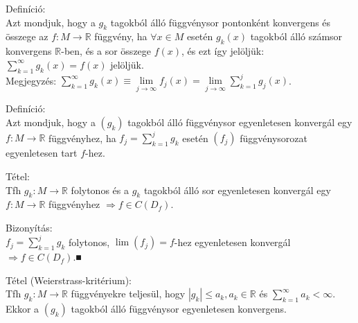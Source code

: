 \documentclass[12pt,a4paper]{scrartcl}
\newenvironment{definicio}{}{}
\newenvironment{tetel}{}{}
\newenvironment{bizonyitas}{}{}
\begin{document}
\begin{definicio}

Definíció:\\
Azt mondjuk, hogy a \(g_{k}\) tagokból álló függvénysor pontonként
konvergens és összege az \(\left. f:M\rightarrow{\mathbb{R}} \right.\)
függvény, ha \(\forall x \in M\) esetén \(g_{k}\left( x \right)\)
tagokból álló számsor konvergens \(\mathbb{R}\)-ben, és a sor összege
\(f\left( x \right)\), és ezt így jelöljük:
\({\sum\limits_{k = 1}^{\infty}{g_{k}\left( x \right)}} = f\left( x \right)\)
jelöljük.\\
Megjegyzés:
\({\sum\limits_{k = 1}^{\infty}{g_{k}\left( x \right) \equiv \underset{j\rightarrow\infty}{\lim}}}f_{j}\left( x \right) = \underset{j\rightarrow\infty}{\lim}{\sum\limits_{k = 1}^{j}{g_{j}\left( x \right)}}\).

\end{definicio}

\begin{definicio}

Definíció:\\
Azt mondjuk, hogy a \(\left( g_{k} \right)\) tagokból álló függvénysor
egyenletesen konvergál egy \(\left. f:M\rightarrow{\mathbb{R}} \right.\)
függvényhez, ha \(f_{j} = {\sum\limits_{k = 1}^{j}g_{k}}\) esetén
\(\left( f_{j} \right)\) függvénysorozat egyenletesen tart \(f\)-hez.

\end{definicio}

\begin{tetel}

Tétel:\\
Tfh \(\left. g_{k}:M\rightarrow{\mathbb{R}} \right.\) folytonos és a
\(g_{k}\) tagokból álló sor egyenletesen konvergál egy
\(\left. f:M\rightarrow{\mathbb{R}} \right.\) függvényhez
\(\left. \Rightarrow f \in C\left( D_{f} \right) \right.\).

\end{tetel}

\begin{bizonyitas}

Bizonyítás:\\
\(f_{j} = {\sum\limits_{k = 1}^{j}g_{k}}\) folytonos,
\(\lim\left( f_{j} \right) = f\)-hez egyenletesen konvergál
\(\left. \Rightarrow f \in C\left( D_{f} \right) \right.\).■

\end{bizonyitas}

\begin{tetel}

Tétel (Weierstrass-kritérium):\\
Tfh \(\left. g_{k}:M\rightarrow{\mathbb{R}} \right.\) függvényekre
teljesül, hogy
\(\left| g_{k} \right| \leq a_{k},a_{k} \in {\mathbb{R}}\) és
\({\sum\limits_{k = 1}^{\infty}a_{k}} < \infty\). Ekkor a
\(\left( g_{k} \right)\) tagokból álló függvénysor egyenletesen
konvergens.

\end{tetel}
\end{document}
